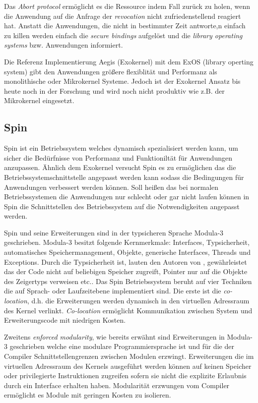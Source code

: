 \documentclass[11pt,technote]{IEEEtran}
\begin{document}
      Das \textit{Abort protocol} erm\"oglicht es die Ressource indem Fall zur\"uck zu holen, wenn die Anwendung auf die
      Anfrage der \textit{revocation} nicht zufriedenstellend reagiert hat.
      Anstatt die Anwendungen, die nicht in bestimmter Zeit antworte,n einfach zu killen werden einfach die
      \textit{secure bindings} aufgel\"ost und die \textit{library operating systems} bzw. Anwendungen informiert.
        
      Die Referenz Implementierung Aegis (Exokernel) mit dem ExOS (library operting system) gibt den Anwendungen gr\"o\ss ere flexiblit\"at 
      und Performanz als monolithische oder Mikrokernel Systeme. Jedoch ist der Exokernel Ansatz bis heute noch in der Forschung und wird
      noch nicht produktiv wie z.B. der Mikrokernel eingesetzt.
        
        
    \subsection{Spin} \label{sec:other:spin}
      Spin ist ein Betriebssystem welches dynamisch spezialisiert werden kann, um sicher die Bed\"urfnisse von Performanz und Funktionilt\"at f\"ur
      Anwendungen anzupassen. \"Ahnlich dem Exokernel versucht Spin es zu erm\"oglichen das die Betriebssystemschnittstelle angepasst werden kann
      sodass die Bedingungen f\"ur Anwendungen verbessert werden k\"onnen. Soll hei\ss en das bei normalen Betriebssystemen die Anwendungen nur 
      schlecht oder gar nicht laufen k\"onnen in Spin die Schnittstellen des Betriebssystem auf die Notwendigkeiten angepasst werden.
      
      Spin und seine Erweiterungen sind in der typsicheren Sprache Modula-3 geschrieben. Modula-3 besitzt folgende Kernmerkmale: 
      Interfaces, Typsicherheit, automatisches Speichermanagement, Objekte, generische Interfaces, Threads und Exceptions.
      Durch die Typsicherheit ist, lauten den Autoren von \cite{inproc:spin}, gew\"ahrleistet das der Code nicht auf beliebigen Speicher zugreift,
      Pointer nur auf die Objekte des Zeigertyps verweisen etc..
      Das Spin Betriebssystem beruht auf vier Techniken die auf Sprach- oder Laufzeitebene implementiert sind.
      Die erste ist die \textit{co-location}, d.h. die Erweiterungen werden dynamisch in den virtuellen Adressraum des Kernel verlinkt.
      \textit{Co-location} erm\"oglicht Kommunikation zwischen System und Erweiterungscode mit niedrigen Kosten.
      
      Zweitens \textit{enforced modularity}, wie bereits erw\"ahnt sind Erweiterungen in Modula-3 geschrieben welche eine modulare
      Programmiersprache ist und f\"ur die der Compiler Schnittstellengrenzen zwischen Modulen erzwingt.
      Erweiterungen die im virtuellen Adressraum des Kernels ausgef\"uhrt werden k\"onnen auf keinen Speicher oder privilegierte Instruktionen 
      zugreifen sofern sie nicht die explizite Erlaubnis durch ein Interface erhalten haben.
      Modularit\"at erzwungen vom Compiler erm\"oglicht es Module mit geringen Kosten zu isolieren.
      
\end{document}
